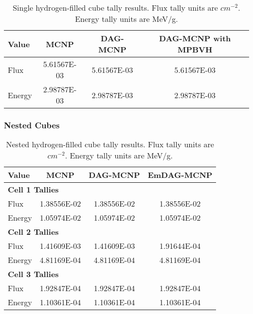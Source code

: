   \begin{table}[H]
    \small
    \begin{center}
      \begin{tabular}{lccc}
        \toprule
        Value & MCNP & DAG-MCNP & DAG-MCNP with MPBVH \\
        \toprule
        \hline
        Flux   & 5.61567E-03 & 5.61567E-03 & 5.61567E-03 \\
        Energy & 2.98787E-03 & 2.98787E-03 & 2.98787E-03 \\
        \bottomrule
      \end{tabular}
      \caption[Single hydrogen-filled cube tally results.]{Single
        hydrogen-filled cube tally results. Flux tally units are
        $cm^{-2}$. Energy tally units are MeV/g.}
      \label{nestedspheres}
    \end{center}
  \end{table}


  \subsubsection{Nested Cubes}

  \begin{table}[H]
    \small
    \begin{center}
      \begin{tabular}{lccc}
        \toprule
        Value & MCNP & DAG-MCNP & EmDAG-MCNP \\
        \toprule
        \multicolumn{4}{l}{\textbf{Cell 1 Tallies}} \\
        \hline
        Flux    &  1.38556E-02 & 1.38556E-02 & 1.38556E-02 \\
        Energy  &  1.05974E-02 & 1.05974E-02 & 1.05974E-02 \\
        \hline
        \multicolumn{4}{l}{\textbf{Cell 2 Tallies}} \\
        \hline
        Flux    & 1.41609E-03 & 1.41609E-03 & 1.91644E-04 \\
        Energy  & 4.81169E-04 & 4.81169E-04 & 4.81169E-04 \\
        \hline
        \multicolumn{4}{l}{\textbf{Cell 3 Tallies}} \\
        \hline
        Flux    & 1.92847E-04 &  1.92847E-04 & 1.92847E-04 \\
        Energy  & 1.10361E-04 &  1.10361E-04 & 1.10361E-04 \\
        \bottomrule
        
      \end{tabular}
      \caption[Nested hydrogen-filled cube tally results.]{Nested
        hydrogen-filled cube tally results. Flux tally units are
        $cm^{-2}$. Energy tally units are MeV/g.}
      \label{nestedspheres}
    \end{center}
  \end{table}


